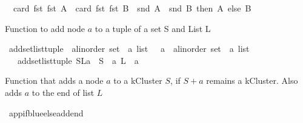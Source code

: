 \begin{isabellebody}
\ \ {\isacharparenleft}{\kern0pt}card\ {\isacharparenleft}{\kern0pt}fst\ {\isacharparenleft}{\kern0pt}fst\ A{\isacharparenright}{\kern0pt}{\isacharparenright}{\kern0pt}\ {\isasymge}\ card\ {\isacharparenleft}{\kern0pt}fst\ {\isacharparenleft}{\kern0pt}fst\ B{\isacharparenright}{\kern0pt}{\isacharparenright}{\kern0pt}\ {\isasymand}\ snd\ A\ {\isasymle}\ snd\ B{\isacharparenright}{\kern0pt}\ then\ A\ else\ B{\isacharparenright}{\kern0pt}{\isachardoublequoteclose}%
\begin{isamarkuptext}%
Function to add node $a$ to a tuple of a set S and List L%
\end{isamarkuptext}\isamarkuptrue%
\isamarkupfalse%
\ add{\isacharunderscore}{\kern0pt}set{\isacharunderscore}{\kern0pt}list{\isacharunderscore}{\kern0pt}tuple\ {\isacharcolon}{\kern0pt}{\isacharcolon}{\kern0pt}\ {\isachardoublequoteopen}{\isacharparenleft}{\kern0pt}{\isacharparenleft}{\kern0pt}{\isacharprime}{\kern0pt}a{\isacharcolon}{\kern0pt}{\isacharcolon}{\kern0pt}linorder\ set\ {\isasymtimes}\ {\isacharprime}{\kern0pt}a\ list{\isacharparenright}{\kern0pt}\ \ {\isasymtimes}\ {\isacharprime}{\kern0pt}a{\isacharparenright}{\kern0pt}\ {\isasymRightarrow}\ {\isacharparenleft}{\kern0pt}{\isacharprime}{\kern0pt}a{\isacharcolon}{\kern0pt}{\isacharcolon}{\kern0pt}linorder\ set\ {\isasymtimes}\ {\isacharprime}{\kern0pt}a\ list{\isacharparenright}{\kern0pt}{\isachardoublequoteclose}\ \isanewline
\ \ \ {\isachardoublequoteopen}add{\isacharunderscore}{\kern0pt}set{\isacharunderscore}{\kern0pt}list{\isacharunderscore}{\kern0pt}tuple\ {\isacharparenleft}{\kern0pt}{\isacharparenleft}{\kern0pt}S{\isacharcomma}{\kern0pt}L{\isacharparenright}{\kern0pt}{\isacharcomma}{\kern0pt}a{\isacharparenright}{\kern0pt}\ {\isacharequal}{\kern0pt}\ {\isacharparenleft}{\kern0pt}S\ {\isasymunion}\ {\isacharbraceleft}{\kern0pt}a{\isacharbraceright}{\kern0pt}{\isacharcomma}{\kern0pt}\ L\ {\isacharat}{\kern0pt}\ {\isacharbrackleft}{\kern0pt}a{\isacharbrackright}{\kern0pt}{\isacharparenright}{\kern0pt}{\isachardoublequoteclose}%
\begin{isamarkuptext}%
Function that adds a node $a$ to a kCluster $S$, if $S + {a}$ remains a kCluster.
    Also adds $a$ to the end of list $L$%
\end{isamarkuptext}\isamarkuptrue%
\isamarkupfalse%
\ app{\isacharunderscore}{\kern0pt}if{\isacharunderscore}{\kern0pt}blue{\isacharunderscore}{\kern0pt}else{\isacharunderscore}{\kern0pt}add{\isacharunderscore}{\kern0pt}end\ {\isacharcolon}{\kern0pt}{\isacharcolon}{\kern0pt}\ \isanewline

\end{isabellebody}
